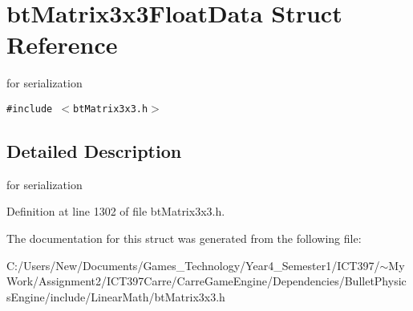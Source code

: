 \hypertarget{structbt_matrix3x3_float_data}{
\section{btMatrix3x3FloatData Struct Reference}
\label{structbt_matrix3x3_float_data}
}
for serialization  


{\tt \#include $<$btMatrix3x3.h$>$}



\subsection{Detailed Description}
for serialization 

Definition at line 1302 of file btMatrix3x3.h.

The documentation for this struct was generated from the following file:\begin{CompactItemize}
\item 
C:/Users/New/Documents/Games\_\-Technology/Year4\_\-Semester1/ICT397/$\sim$My Work/Assignment2/ICT397Carre/CarreGameEngine/Dependencies/BulletPhysicsEngine/include/LinearMath/btMatrix3x3.h\end{CompactItemize}
